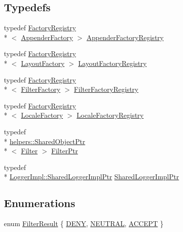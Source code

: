 \subsection*{Typedefs}
\begin{DoxyCompactItemize}
\item 
typedef \hyperlink{classlog4cplus_1_1spi_1_1FactoryRegistry}{Factory\-Registry}\\*
$<$ \hyperlink{classlog4cplus_1_1spi_1_1AppenderFactory}{Appender\-Factory} $>$ \hyperlink{namespacelog4cplus_1_1spi_aaec7122d9afe7d4e06cd100cc62418f7}{Appender\-Factory\-Registry}
\item 
typedef \hyperlink{classlog4cplus_1_1spi_1_1FactoryRegistry}{Factory\-Registry}\\*
$<$ \hyperlink{classlog4cplus_1_1spi_1_1LayoutFactory}{Layout\-Factory} $>$ \hyperlink{namespacelog4cplus_1_1spi_afcec0afcb2d25a187db1e85feb2d0796}{Layout\-Factory\-Registry}
\item 
typedef \hyperlink{classlog4cplus_1_1spi_1_1FactoryRegistry}{Factory\-Registry}\\*
$<$ \hyperlink{classlog4cplus_1_1spi_1_1FilterFactory}{Filter\-Factory} $>$ \hyperlink{namespacelog4cplus_1_1spi_a201100cf253db6d2160f88b20bbf7d9d}{Filter\-Factory\-Registry}
\item 
typedef \hyperlink{classlog4cplus_1_1spi_1_1FactoryRegistry}{Factory\-Registry}\\*
$<$ \hyperlink{classlog4cplus_1_1spi_1_1LocaleFactory}{Locale\-Factory} $>$ \hyperlink{namespacelog4cplus_1_1spi_ae93cf5d075d4355919917879db043004}{Locale\-Factory\-Registry}
\item 
typedef \\*
\hyperlink{classlog4cplus_1_1helpers_1_1SharedObjectPtr}{helpers\-::\-Shared\-Object\-Ptr}\\*
$<$ \hyperlink{classlog4cplus_1_1spi_1_1Filter}{Filter} $>$ \hyperlink{namespacelog4cplus_1_1spi_abfdea757523ce8fe4598502a29bc7545}{Filter\-Ptr}
\item 
typedef \\*
\hyperlink{classlog4cplus_1_1spi_1_1LoggerImpl_a714f4769a8d2b7f954eb193df7bcd256}{Logger\-Impl\-::\-Shared\-Logger\-Impl\-Ptr} \hyperlink{namespacelog4cplus_1_1spi_ab9e7a34d7e6dad613cfc4f5d5bef028c}{Shared\-Logger\-Impl\-Ptr}
\end{DoxyCompactItemize}
\subsection*{Enumerations}
\begin{DoxyCompactItemize}
\item 
enum \hyperlink{namespacelog4cplus_1_1spi_aa910f475d36c00f943ef78e37d11e3f6}{Filter\-Result} \{ \hyperlink{namespacelog4cplus_1_1spi_aa910f475d36c00f943ef78e37d11e3f6a4782fd85324c15b37a4de87628f51634}{D\-E\-N\-Y}, 
\hyperlink{namespacelog4cplus_1_1spi_aa910f475d36c00f943ef78e37d11e3f6ae75ab2e37a542c14fe57be606502a550}{N\-E\-U\-T\-R\-A\-L}, 
\hyperlink{namespacelog4cplus_1_1spi_aa910f475d36c00f943ef78e37d11e3f6a222b6ce4c30f1d7d9164b901bb2907a7}{A\-C\-C\-E\-P\-T}
 \}
\end{DoxyCompactItemize}
